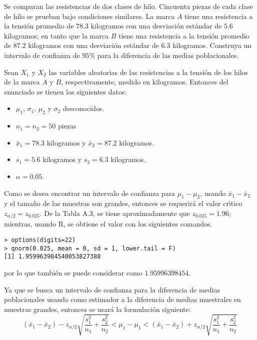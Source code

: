 \begin{enunciado}
 Se comparan las resistencias de dos clases de hilo. Cincuenta piezas de cada clase de hilo se prueban bajo condiciones similares. La marca $A$ tiene una resistencia a la tensi\'on promedio de $78.3$ kilogramos con una desviaci\'on est\'andar de $5.6$ kilogramos; en tanto que la marca $B$ tiene una resistencia a la tensi\'on promedio de $87.2$ kilogramos con una desviaci\'on est\'andar de $6.3$ kilogramos. Construya un intervalo de confianza de $95\%$ para la diferencia de las medias poblacionales.
\end{enunciado}

\begin{solucion}
 Sean $X_1$ y $X_2$ las variables aleatorias de las resistencias a la tensi\'on de los hilos de la marca $A$ y $B$, respectivamente, medido en kilogramos. Entonces del enunciado se tienen los siguientes datos:
 \begin{itemize}
  \item $\mu_1$, $\sigma_1$, $\mu_2$ y $\sigma_2$ desconocidos.
  \item $n_1 = n_2 = 50$ piezas
  \item $\bar{x}_1 = 78.3$ kilogramos y $\bar{x}_2 = 87.2$ kilogramos.
  \item $s_1 = 5.6$ kilogramos y $s_2 = 6.3$ kilogramos.
  \item $\alpha = 0.05$.
 \end{itemize}
 Como se desea encontrar un intervalo de confianza para $\mu_1 - \mu_2$, usando $\bar{x}_1 - \bar{x}_2$ y el tama\~no de las muestras son grandes, entonces se requerir\'a el valor cr\'{\i}tico $z_{\alpha/2} = z_{0.025}$. De la Tabla A.3, se tiene aproximadamente que $z_{0.025} = 1.96$; mientras, usando R, se obtiene el valor con los siguientes comandos.
 \begin{verbatim}
> options(digits=22)
> qnorm(0.025, mean = 0, sd = 1, lower.tail = F)
[1] 1.959963984540053827388
 \end{verbatim}
 \vspace{-0.5cm}
 por lo que tambi\'en se puede considerar como $1.95996398454$.
 \par 
 Ya que se busca un intervalo de confianza para la diferencia de medias poblacionales usando como estimador a la diferencia de medias muestrales en muestras grandes, entonces se usar\'a la formulaci\'on siguiente:
 \begin{equation*}
  \left( \bar{x}_1 - \bar{x}_2 \right) - z_{\alpha/2}\sqrt{\frac{s_1^2}{n_1} + \frac{s_2^2}{n_2}} < \mu_1 - \mu_1 < \left( \bar{x}_1 - \bar{x}_2 \right) + z_{\alpha/2}\sqrt{\frac{s_1^2}{n_1} + \frac{s_2^2}{n_2}}

\end{equation*}
\end{solucion}
